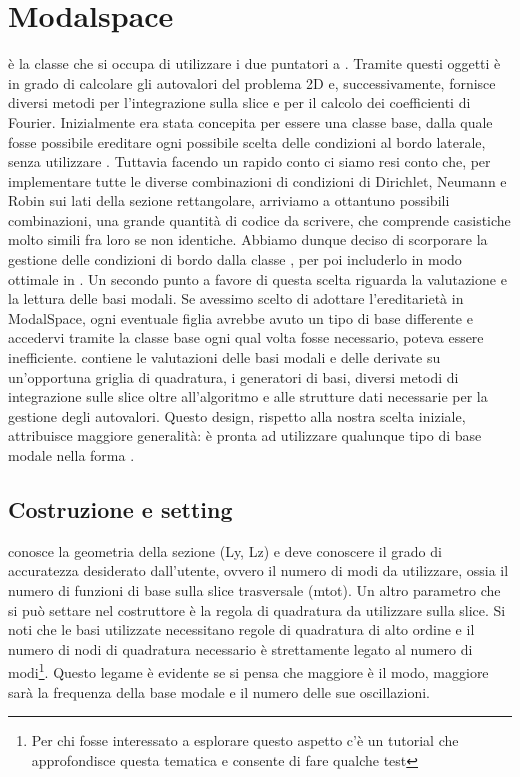 \section{Modalspace}
 \`e la classe che si occupa di utilizzare i due puntatori a .
Tramite questi oggetti \`e in grado di calcolare gli autovalori del problema 2D e, successivamente,
fornisce diversi metodi per l'integrazione sulla slice e per il calcolo dei coefficienti di Fourier.
Inizialmente  era stata concepita per essere una classe base, 
dalla quale fosse possibile ereditare ogni possibile scelta delle condizioni al bordo laterale, senza utilizzare . 
Tuttavia facendo un rapido conto ci siamo resi conto che, per implementare tutte le diverse combinazioni di condizioni 
di Dirichlet, Neumann e Robin sui lati della sezione rettangolare, arriviamo a ottantuno possibili combinazioni, 
una grande quantit\`a di codice da scrivere, che comprende casistiche molto simili fra loro se non identiche. 
Abbiamo dunque deciso di scorporare la gestione delle condizioni di bordo dalla classe , 
per poi includerlo in modo ottimale in . 
Un secondo punto a favore di questa scelta riguarda la valutazione e la lettura delle basi modali.
Se avessimo scelto di adottare l'ereditariet\`a in ModalSpace, ogni eventuale 
figlia avrebbe avuto un tipo di base differente e accedervi tramite la classe base ogni qual volta 
fosse necessario, poteva essere inefficiente.  contiene le valutazioni delle basi modali e delle derivate 
su un'opportuna griglia di quadratura, i generatori di basi, diversi metodi di integrazione sulle slice oltre all'algoritmo e alle strutture dati necessarie
per la gestione degli autovalori. Questo design, rispetto alla nostra scelta iniziale, attribuisce maggiore 
generalit\`a:  \`e pronta ad utilizzare qualunque tipo di base modale nella forma .

\subsection{Costruzione e setting}
 conosce la geometria della sezione (Ly, Lz) e deve conoscere il grado di accuratezza desiderato 
dall'utente, ovvero il numero di modi da utilizzare, ossia il numero di funzioni di base sulla slice trasversale (mtot). 
Un altro parametro che si pu\`o settare nel costruttore \`e la regola di quadratura da utilizzare sulla slice. 
Si noti che le basi utilizzate necessitano regole di quadratura di alto ordine e il numero di nodi di quadratura necessario
\`e strettamente legato al numero di modi\footnote{Per chi fosse interessato a esplorare questo aspetto c'\`e un tutorial che approfondisce questa
tematica e consente di fare qualche test}.
Questo legame \`e evidente se si pensa che maggiore \`e il modo, 
maggiore sar\`a la frequenza della base modale e il numero delle sue oscillazioni. 

